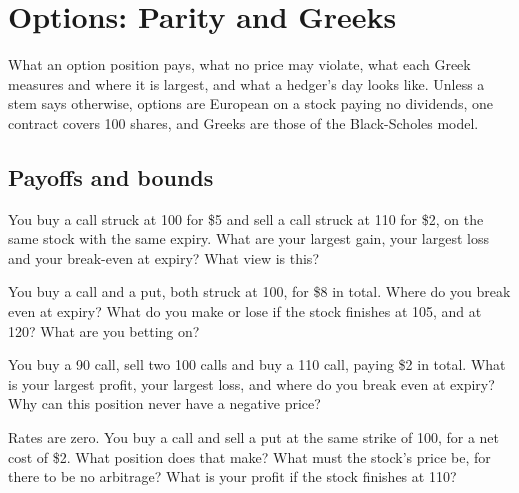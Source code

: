 \chapter{Options: Parity and Greeks}\label{ch:iv2:options-parity-and-greeks}

\begin{ivtrains}
What an option position pays, what no price may violate, what each Greek measures and where it is largest, and what a hedger's day looks like. Unless a stem says otherwise, options are European on a stock paying no dividends, one contract covers 100 shares, and Greeks are those of the Black-Scholes model.
\end{ivtrains}

\section{Payoffs and bounds}

\begin{question}\label{iq:iv2:options-parity-and-greeks:1}
You buy a call struck at 100 for \$5 and sell a call struck at 110 for \$2, on the same stock with the same expiry. What are your largest gain, your largest loss and your break-even at expiry? What view is this?
\end{question}

\begin{question}\label{iq:iv2:options-parity-and-greeks:2}
You buy a call and a put, both struck at 100, for \$8 in total. Where do you break even at expiry? What do you make or lose if the stock finishes at 105, and at 120? What are you betting on?
\end{question}

\begin{question}\label{iq:iv2:options-parity-and-greeks:3}
You buy a 90 call, sell two 100 calls and buy a 110 call, paying \$2 in total. What is your largest profit, your largest loss, and where do you break even at expiry? Why can this position never have a negative price?
\end{question}

\begin{question}\label{iq:iv2:options-parity-and-greeks:4}
Rates are zero. You buy a call and sell a put at the same strike of 100, for a net cost of \$2. What position does that make? What must the stock's price be, for there to be no arbitrage? What is your profit if the stock finishes at 110?
\end{question}

